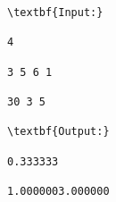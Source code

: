 \begin{verbatim}
\textbf{Input:}

4

3 5 6 1

30 3 5

\textbf{Output:}

0.333333

1.0000003.000000\end{verbatim}